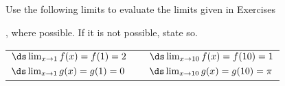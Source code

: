 \begin{exerciseset}{Use the following limits to evaluate the limits given in Exercises}{, where possible. If it is not possible, state so.

\begin{tabular}{lll}
$\ds \lim_{x\to1}f(x) = f(1) = 2$ & \quad\quad &$\ds \lim_{x\to10} f(x) = f(10) = 1$\\
$\ds \lim_{x\to1}g(x) = g(1) = 0$ &  & $\ds \lim_{x\to10} g(x) = g(10) = \pi$
\end{tabular}}





\end{exerciseset}
